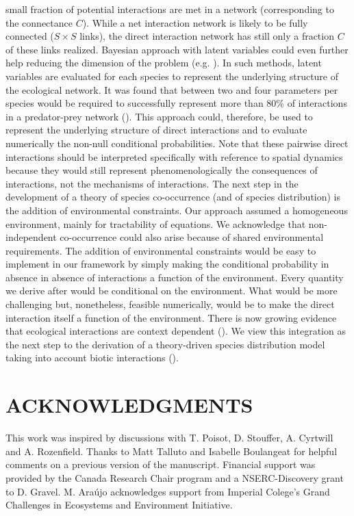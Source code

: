 small fraction of potential interactions are met in a network (corresponding
to the connectance $C$). While a net interaction network is likely to be fully
connected ($S\times S$ links), the direct interaction network has still only a
fraction $C$ of these links realized. Bayesian approach with latent variables
could even further help reducing the dimension of the problem (e.g.
\citealt{Rohr2010Modeling, Ovaskainen2010Modeling}). In such methods, latent variables
are evaluated for each species to represent the underlying structure of the
ecological network. It was found that between two and four parameters per
species would be required to successfully represent more than 80\% of interactions
in a predator-prey network (\citealt{Rohr2010Modeling}). This approach could,
therefore, be used to represent the underlying structure of direct interactions
and to evaluate numerically the non-null conditional probabilities. Note that these pairwise direct interactions should be interpreted
specifically with reference to spatial dynamics because they would still
represent phenomenologically the consequences of interactions, not the
mechanisms of interactions.
%
The next step in the development of a theory of species co-occurrence (and of
species distribution) is the addition of environmental constraints. Our
approach assumed a homogeneous environment, mainly for tractability of
equations. We acknowledge that non-independent co-occurrence could also arise
because of  shared environmental requirements. The addition of environmental
constraints would be easy to implement in our framework by simply making the
conditional probability in absence in absence of interactions a function of
the environment. Every quantity we derive after would be conditional on the
environment. What would be more challenging but, nonetheless, feasible
numerically, would be to make the direct interaction itself a function of the
environment. There is now growing evidence that ecological interactions are
context dependent (\citealt{Chamberlain2014How, Poisot2012Dissimilarity}). We
view this integration as the next step to the derivation of a theory-driven
species distribution model taking into account biotic interactions (\citealt{Thuiller2013Road}).

\section{ACKNOWLEDGMENTS}
This work was inspired by discussions with T. Poisot, D. Stouffer, A.
Cyrtwill and A. Rozenfield. Thanks to Matt Talluto and Isabelle Boulangeat for helpful comments on a previous version of the manuscript. Financial support was provided by the Canada Research Chair program
and a NSERC-Discovery grant to D. Gravel. M. Ara\'ujo acknowledges support from Imperial Colege’s Grand Challenges in Ecosystems and Environment Initiative.




